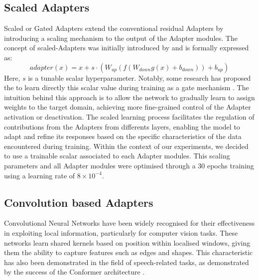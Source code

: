 \subsection{Scaled Adapters}
Scaled or Gated Adapters extend the conventional residual Adapters by introducing a scaling mechanism to the output of the Adapter modules. The concept of scaled-Adapters was initially introduced by \cite{he2022towards} and is formally expressed as:
\begin{equation}
    adapter(x) = x + s \cdot (W_{up}(f(W_{down}g(x) + b_{down})) + b_{up})    
\end{equation}
Here, $s$ is a tunable scalar hyperparameter. Notably, some research has proposed the to learn directly this scalar value during training as a gate mechanism \cite{mao-etal-2022-unipelt}. The intuition behind this approach is to allow the network to gradually learn to assign weights to the target domain, achieving more fine-grained control of the Adapter activation or deactivation. The scaled learning process facilitates the regulation of contributions from the Adapters from differents layers, enabling the model to adapt and refine its responses based on the specific characteristics of the data encountered during training.
Within the context of our experiments, we decided to use a trainable scalar associated to each Adapter modules. This scaling parameters and all Adapter modules were optimised through a 30 epochs training using a learning rate of $8 \times 10^{-4}$.

\subsection{Convolution based Adapters}
Convolutional Neural Networks have been widely recognised for their effectiveness in exploiting local information, particularly for computer vision tasks. These networks learn shared kernels based on position within localised windows, giving them the ability to capture features such as edges and shapes. This characteristic has also been demonstrated in the field of speech-related tasks, as demonstrated by the success of the Conformer architecture \cite{gulati2020conformer}.

